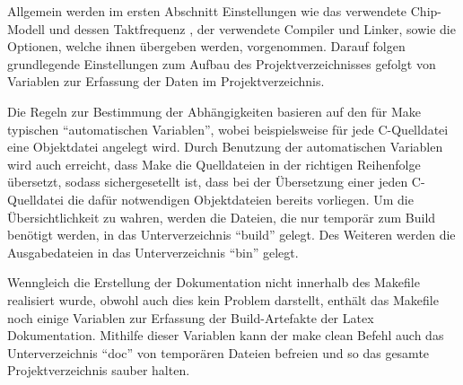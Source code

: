 Allgemein werden im ersten Abschnitt Einstellungen wie das verwendete
Chip-Modell und dessen Taktfrequenz , der verwendete Compiler und
Linker, sowie die Optionen, welche ihnen übergeben werden, vorgenommen.
Darauf folgen grundlegende Einstellungen zum Aufbau des Projektverzeichnisses
gefolgt von Variablen zur Erfassung der Daten im Projektverzeichnis.

Die Regeln zur Bestimmung der Abhängigkeiten basieren auf den für
Make typischen ``automatischen Variablen'', wobei beispielsweise
für jede C-Quelldatei eine Objektdatei angelegt wird. Durch Benutzung
der automatischen Variablen wird auch erreicht, dass Make die Quelldateien
in der richtigen Reihenfolge übersetzt, sodass sichergesetellt ist,
dass bei der Übersetzung einer jeden C-Quelldatei die dafür notwendigen
Objektdateien bereits vorliegen. Um die Übersichtlichkeit zu wahren,
werden die Dateien, die nur temporär zum Build benötigt werden, in
das Unterverzeichnis ``build'' gelegt. Des Weiteren werden die Ausgabedateien
in das Unterverzeichnis ``bin'' gelegt.

Wenngleich die Erstellung der Dokumentation nicht innerhalb des Makefile
realisiert wurde, obwohl auch dies kein Problem darstellt, enthält
das Makefile noch einige Variablen zur Erfassung der Build-Artefakte
der Latex Dokumentation. Mithilfe dieser Variablen kann der make clean
Befehl auch das Unterverzeichnis ``doc'' von temporären Dateien
befreien und so das gesamte Projektverzeichnis sauber halten.

 

